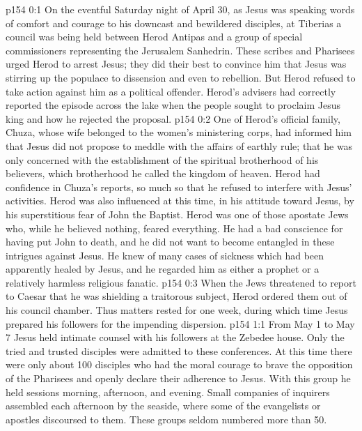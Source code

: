 \author{Midwayer Commission}
\vs p154 0:1 On the eventful Saturday night of April 30, as Jesus was speaking words of comfort and courage to his downcast and bewildered disciples, at Tiberias a council was being held between Herod Antipas and a group of special commissioners representing the Jerusalem Sanhedrin. These scribes and Pharisees urged Herod to arrest Jesus; they did their best to convince him that Jesus was stirring up the populace to dissension and even to rebellion. But Herod refused to take action against him as a political offender. Herod’s advisers had correctly reported the episode across the lake when the people sought to proclaim Jesus king and how he rejected the proposal.
\vs p154 0:2 One of Herod’s official family, Chuza, whose wife belonged to the women’s ministering corps, had informed him that Jesus did not propose to meddle with the affairs of earthly rule; that he was only concerned with the establishment of the spiritual brotherhood of his believers, which brotherhood he called the kingdom of heaven. Herod had confidence in Chuza’s reports, so much so that he refused to interfere with Jesus’ activities. Herod was also influenced at this time, in his attitude toward Jesus, by his superstitious fear of John the Baptist. Herod was one of those apostate Jews who, while he believed nothing, feared everything. He had a bad conscience for having put John to death, and he did not want to become entangled in these intrigues against Jesus. He knew of many cases of sickness which had been apparently healed by Jesus, and he regarded him as either a prophet or a relatively harmless religious fanatic.
\vs p154 0:3 When the Jews threatened to report to Caesar that he was shielding a traitorous subject, Herod ordered them out of his council chamber. Thus matters rested for one week, during which time Jesus prepared his followers for the impending dispersion.
\vs p154 1:1 From May 1 to May 7 Jesus held intimate counsel with his followers at the Zebedee house. Only the tried and trusted disciples were admitted to these conferences. At this time there were only about 100 disciples who had the moral courage to brave the opposition of the Pharisees and openly declare their adherence to Jesus. With this group he held sessions morning, afternoon, and evening. Small companies of inquirers assembled each afternoon by the seaside, where some of the evangelists or apostles discoursed to them. These groups seldom numbered more than 50.

